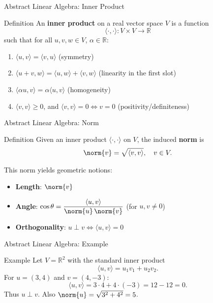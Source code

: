 \blueheader
\begin{frame}{Abstract Linear Algebra: Inner Product}
\begin{bluebox*}{Definition}
An \textbf{inner product} on a real vector space $V$ is a function
\[
\langle \cdot, \cdot \rangle : V \times V \to \mathbb{R}
\]
such that for all $u,v,w \in V$, $\alpha \in \mathbb{R}$:
\begin{enumerate}
    \item $\langle u,v \rangle = \langle v,u \rangle$ \hfill (symmetry)
    \item $\langle u+v,w \rangle = \langle u,w \rangle + \langle v,w \rangle$ \hfill (linearity in the first slot)
    \item $\langle \alpha u, v \rangle = \alpha \langle u,v \rangle$ \hfill (homogeneity)
    \item $\langle v,v \rangle \ge 0$, and $\langle v,v \rangle = 0 \iff v=0$ \hfill (positivity/definiteness)
\end{enumerate}
\end{bluebox*}
\end{frame}

\redheader
\begin{frame}{Abstract Linear Algebra: Norm}
\begin{redbox*}{Definition}
Given an inner product $\langle \cdot, \cdot \rangle$ on $V$, the induced \textbf{norm} is
\[
\norm{v} = \sqrt{\langle v, v \rangle}, \quad v \in V.
\]

This norm yields geometric notions:
\begin{itemize}
    \item \textbf{Length}: $\norm{v}$
    \item \textbf{Angle}: $\displaystyle \cos \theta = \frac{\langle u, v \rangle}{\norm{u}\,\norm{v}}$ (for $u,v\neq 0$)
    \item \textbf{Orthogonality}: $u \perp v \iff \langle u, v \rangle = 0$
\end{itemize}
\end{redbox*}
\end{frame}

\greenheader
\begin{frame}{Abstract Linear Algebra: Example}
\begin{greenbox*}{Example}
Let $V = \mathbb{R}^2$ with the standard inner product
\[
\langle u, v \rangle = u_1 v_1 + u_2 v_2.
\]
For $u = (3,4)$ and $v = (4,-3)$:
\[
\langle u, v \rangle = 3 \cdot 4 + 4 \cdot (-3) = 12 - 12 = 0.
\]
Thus $u \perp v$. Also $\norm{u} = \sqrt{3^2+4^2}=5$.
\end{greenbox*}
\end{frame}

